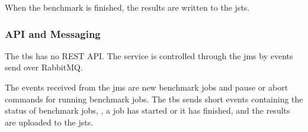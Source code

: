 When the benchmark is finished, the results are written to the \acf{jsts}.

\subsubsection{API and Messaging}
\label{sec:benchmarking_api}
The \ac{tbs} has no REST API.
The service is controlled through the \ac{jms} by events send over RabbitMQ.

The events received from the \ac{jms} are new benchmark jobs and pause or abort commands for running benchmark jobs.
The \ac{tbs} sends short events containing the status of benchmark jobs, \eg, a job has started or it has finished, and the results are uploaded to the \acl{jsts}.